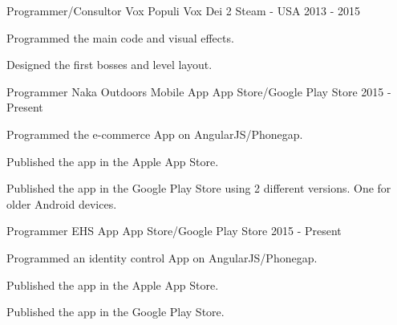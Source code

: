 

\begin{cventries}

  \cventry
    {Programmer/Consultor} %
    {Vox Populi Vox Dei 2} %
    {Steam - USA} %
    {2013 - 2015} %
    {
      \begin{cvitems} %
        \item {Programmed the main code and visual effects.}
        \item {Designed the first bosses and level layout.}
      \end{cvitems}
    }

  \cventry
    {Programmer} %
    {Naka Outdoors Mobile App} %
    {App Store/Google Play Store} %
    {2015 - Present} %
    {
      \begin{cvitems} %
        \item {Programmed the e-commerce App on AngularJS/Phonegap.}
        \item {Published the app in the Apple App Store.}
        \item {Published the app in the Google Play Store using 2 different versions. One for older Android devices.}
      \end{cvitems}
    }
  \cventry
    {Programmer} %
    {EHS App} %
    {App Store/Google Play Store} %
    {2015 - Present} %
    {
      \begin{cvitems} %
        \item {Programmed an identity control App on AngularJS/Phonegap.}
        \item {Published the app in the Apple App Store.}
        \item {Published the app in the Google Play Store.}
      \end{cvitems}
    }

\end{cventries}
